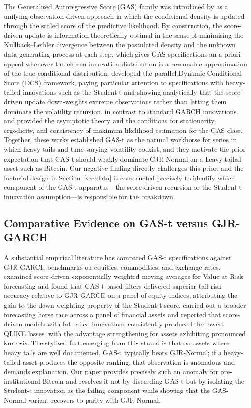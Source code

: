 The Generalised Autoregressive Score (GAS) family was introduced by \citet{creal2013} as a unifying observation-driven approach in which the conditional density is updated through the scaled score of the predictive likelihood. By construction, the score-driven update is information-theoretically optimal in the sense of minimising the Kullback--Leibler divergence between the postulated density and the unknown data-generating process at each step, which gives GAS specifications an a priori appeal whenever the chosen innovation distribution is a reasonable approximation of the true conditional distribution. \citet{harvey2013} developed the parallel Dynamic Conditional Score (DCS) framework, paying particular attention to specifications with heavy-tailed innovations such as the Student-t and showing analytically that the score-driven update down-weights extreme observations rather than letting them dominate the volatility recursion, in contrast to standard GARCH innovations. \citet{blasques2014} and \citet{blasques2018} provided the asymptotic theory and the conditions for stationarity, ergodicity, and consistency of maximum-likelihood estimation for the GAS class. Together, these works established GAS-t as the natural workhorse for series in which heavy tails and time-varying volatility coexist, and they motivate the prior expectation that GAS-t should weakly dominate GJR-Normal on a heavy-tailed asset such as Bitcoin. Our negative finding directly challenges this prior, and the factorial design in Section~\ref{sec:data} is constructed precisely to identify which component of the GAS-t apparatus---the score-driven recursion or the Student-t innovation assumption---is responsible for the breakdown.

\subsection{Comparative Evidence on GAS-t versus GJR-GARCH}

A substantial empirical literature has compared GAS-t specifications against GJR-GARCH benchmarks on equities, commodities, and exchange rates. \citet{lucas2016} examined score-driven exponentially weighted moving averages for Value-at-Risk forecasting and found that GAS-t-based filters delivered superior tail-risk accuracy relative to GJR-GARCH on a panel of equity indices, attributing the gain to the down-weighting property of the Student-t score. \citet{catania2019} carried out a broader forecasting horse race across a panel of financial assets and reported that score-driven models with fat-tailed innovations consistently produced the lowest QLIKE losses, with the advantage strengthening for assets exhibiting pronounced kurtosis. The stylised fact emerging from this strand is that on assets where heavy tails are well documented, GAS-t typically beats GJR-Normal; if a heavy-tailed asset produces the opposite ranking, that observation is anomalous and demands explanation. Our paper provides precisely such an anomaly for pre-institutional Bitcoin and resolves it not by discarding GAS-t but by isolating the Student-t innovation as the failing component while showing that the GAS-Normal variant recovers to parity with GJR-Normal.

